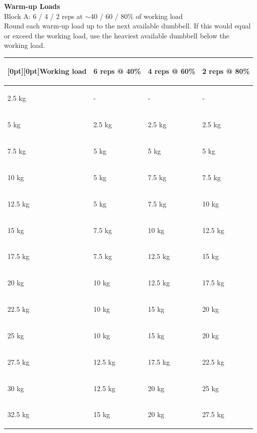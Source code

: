 \documentclass[11pt,a4paper]{article}
\begin{document}
\begin{center}
{\fontsize{22}{26}\selectfont\bfseries Warm-up Loads}\\[0.42cm]
{\fontsize{8.7}{10.4}\selectfont\color{muted} Block A: 6 / 4 / 2 reps at $\sim$40 / 60 / 80\% of working load}\\[0.12cm]
{\fontsize{8.3}{10}\selectfont\color{muted} Round each warm-up load up to the next available dumbbell. If this would equal or exceed the working load, use the heaviest available dumbbell below the working load.}
\end{center}

\vspace{0.10cm}
\setlength{\arrayrulewidth}{0.55pt}
\setlength{\tabcolsep}{0pt}
\begin{center}
{\fontsize{9.2}{11}\selectfont
\begin{tabular}{|>{\bfseries}C{4.15cm}|C{4.32cm}|C{4.32cm}|C{4.32cm}|}
\hline
{}\rule{0pt}{10.65mm}\raisebox{3.9mm}[0pt][0pt]{Working load} & \textbf{6 reps @ 40\%} & \textbf{4 reps @ 60\%} & \textbf{2 reps @ 80\%} \\
\hline
\rule[-4.2mm]{0pt}{10.65mm}2.5 kg & - & - & - \\
\rule[-4.2mm]{0pt}{10.65mm}5 kg & 2.5 kg & 2.5 kg & 2.5 kg \\
\rule[-4.2mm]{0pt}{10.65mm}7.5 kg & 5 kg & 5 kg & 5 kg \\
\rule[-4.2mm]{0pt}{10.65mm}10 kg & 5 kg & 7.5 kg & 7.5 kg \\
\rule[-4.2mm]{0pt}{10.65mm}12.5 kg & 5 kg & 7.5 kg & 10 kg \\
\rule[-4.2mm]{0pt}{10.65mm}15 kg & 7.5 kg & 10 kg & 12.5 kg \\
\rule[-4.2mm]{0pt}{10.65mm}17.5 kg & 7.5 kg & 12.5 kg & 15 kg \\
\rule[-4.2mm]{0pt}{10.65mm}20 kg & 10 kg & 12.5 kg & 17.5 kg \\
\rule[-4.2mm]{0pt}{10.65mm}22.5 kg & 10 kg & 15 kg & 20 kg \\
\rule[-4.2mm]{0pt}{10.65mm}25 kg & 10 kg & 15 kg & 20 kg \\
\rule[-4.2mm]{0pt}{10.65mm}27.5 kg & 12.5 kg & 17.5 kg & 22.5 kg \\
\rule[-4.2mm]{0pt}{10.65mm}30 kg & 12.5 kg & 20 kg & 25 kg \\
\rule[-4.2mm]{0pt}{10.65mm}32.5 kg & 15 kg & 20 kg & 27.5 kg \\

\end{tabular}}
\end{center}
\end{document}
